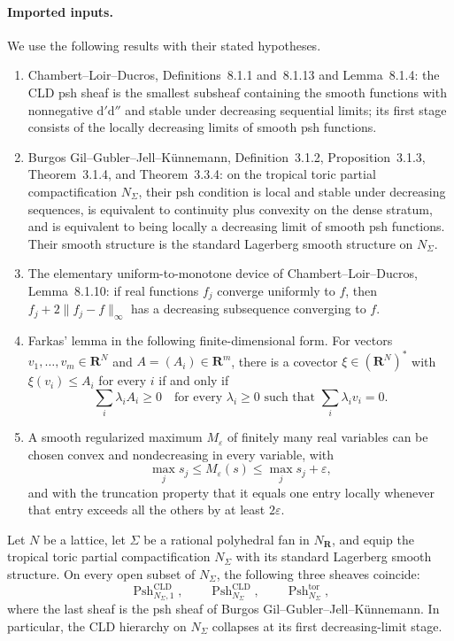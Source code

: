 
\paragraph{Imported inputs.}
We use the following results with their stated hypotheses.
\begin{enumerate}
\item Chambert--Loir--Ducros, Definitions~8.1.1 and~8.1.13 and
Lemma~8.1.4: the CLD psh sheaf is the smallest subsheaf containing the
smooth functions with nonnegative $\mathrm d'\mathrm d''$ and stable under
decreasing sequential limits; its first stage consists of the locally
decreasing limits of smooth psh functions.
\item Burgos Gil--Gubler--Jell--K\"unnemann, Definition~3.1.2,
Proposition~3.1.3, Theorem~3.1.4, and Theorem~3.3.4: on the tropical toric
partial compactification $N_\Sigma$, their psh condition is local and stable
under decreasing sequences, is equivalent to continuity plus convexity on
the dense stratum, and is equivalent to being locally a decreasing limit of
smooth psh functions.  Their smooth structure is the standard Lagerberg
smooth structure on $N_\Sigma$.
\item The elementary uniform-to-monotone device of Chambert--Loir--Ducros,
Lemma~8.1.10: if real functions $f_j$ converge uniformly to $f$, then
$f_j+2\lVert f_j-f\rVert_\infty$ has a decreasing subsequence converging to
$f$.
\item Farkas' lemma in the following finite-dimensional form.  For vectors
$v_1,\ldots,v_m\in\mathbf R^N$ and $A=(A_i)\in\mathbf R^m$, there is a
covector $\xi\in(\mathbf R^N)^*$ with $\xi(v_i)\leq A_i$ for every $i$ if
and only if
\[
 \sum_i\lambda_iA_i\geq0
 \quad\text{for every }\lambda_i\geq0
 \text{ such that }\sum_i\lambda_i v_i=0.
\]
\item A smooth regularized maximum $M_\varepsilon$ of finitely many real
variables can be chosen convex and nondecreasing in every variable, with
\[
 \max_j s_j\leq M_\varepsilon(s)\leq\max_j s_j+\varepsilon,
\]
and with the truncation property that it equals one entry locally whenever
that entry exceeds all the others by at least $2\varepsilon$.
\end{enumerate}

\begin{proposition}
\label{prop:p07-toric-cld-collapse-candidate}
Let $N$ be a lattice, let $\Sigma$ be a rational polyhedral fan in
$N_{\mathbf R}$, and equip the tropical toric partial compactification
$N_\Sigma$ with its standard Lagerberg smooth structure.  On every open
subset of $N_\Sigma$, the following three sheaves coincide:
\[
 \operatorname{Psh}^{\mathrm{CLD}}_{N_\Sigma,1},\qquad
 \operatorname{Psh}^{\mathrm{CLD}}_{N_\Sigma},\qquad
 \operatorname{Psh}^{\mathrm{tor}}_{N_\Sigma},
\]
where the last sheaf is the psh sheaf of Burgos
Gil--Gubler--Jell--K\"unnemann.  In particular, the CLD hierarchy on
$N_\Sigma$ collapses at its first decreasing-limit stage.
\end{proposition}

